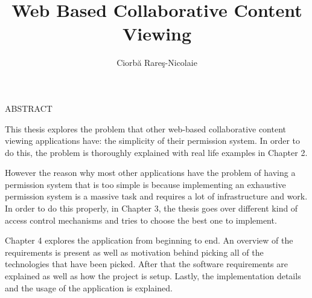\documentclass[12pt]{report}
\begin{document}
\title{Web Based Collaborative Content Viewing}					   
\author{Ciorbă Rareş-Nicolaie}											
				
\maketitle


\newpage
\thispagestyle{empty}
\mbox{}
\newpage
{} 

\cleardoublepage
ABSTRACT

This thesis explores the problem that other web-based collaborative content viewing applications have: the simplicity of their permission system. In order to do this, the problem is thoroughly explained with real life examples in Chapter 2.

However the reason why most other applications have the problem of having a permission system that is too simple is because implementing an exhaustive permission system is a massive task and requires a lot of infrastructure and work. In order to do this properly, in Chapter 3, the thesis goes over different kind of access control mechanisms and tries to choose the best one to implement.



Chapter 4 explores the application from beginning to end. An overview of the requirements is present as well as motivation behind picking all of the technologies that have been picked. After that the software requirements are explained as well as how the project is setup. Lastly, the implementation details and the usage of the application is explained.
\end{document}
